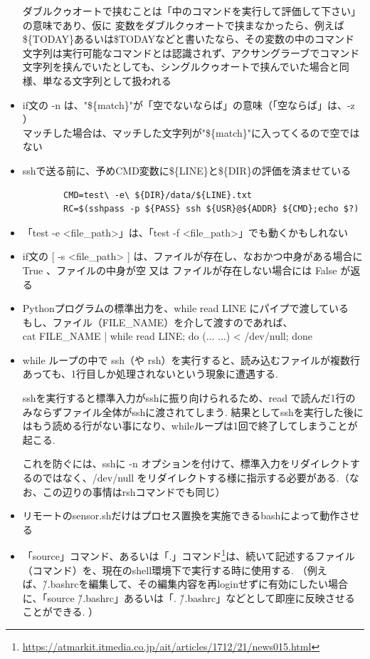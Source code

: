 \documentclass[12pt,a4paper,uplatex]{jsarticle}
\begin{document}
\begin{itemize}
	ダブルクゥオートで挟むことは「中のコマンドを実行して評価して下さい」の意味であり、仮に
	変数をダブルクゥオートで挟まなかったら、例えば\$\{TODAY\}あるいは\$TODAYなどと書いたなら、その変数の中のコマンド文字列は実行可能なコマンドとは認識されず、アクサングラーブでコマンド文字列を挟んでいたとしても、シングルクゥオートで挟んでいた場合と同様、単なる文字列として扱われる
	\item if文の -n は、"\$\{match\}"が「空でないならば」の意味（「空ならば」は、-z ）\\マッチした場合は、マッチした文字列が"\$\{match\}"に入ってくるので空ではない
	\item sshで送る前に、予めCMD変数に\$\{LINE\}と\$\{DIR\}の評価を済ませている
	\begin{verbatim}
		CMD=test\ -e\ ${DIR}/data/${LINE}.txt
		RC=$(sshpass -p ${PASS} ssh ${USR}@${ADDR} ${CMD};echo $?)
	\end{verbatim}
	\item 「test -e <file\_path>」は、「test -f <file\_path>」でも動くかもしれない
	\item if文の [ -s <file\_path> ] は、ファイルが存在し、なおかつ中身がある場合に True 、ファイルの中身が空 又は ファイルが存在しない場合には False が返る 
	\item Pythonプログラムの標準出力を、while read LINE にパイプで渡している\\もし、ファイル（FILE\_NAME）を介して渡すのであれば、\\ cat FILE\_NAME | while read LINE; do (... ...) < /dev/null; done
	\item while ループの中で ssh（や rsh）を実行すると、読み込むファイルが複数行あっても、1行目しか処理されないという現象に遭遇する.
	
	sshを実行すると標準入力がsshに振り向けられるため、read で読んだ1行のみならずファイル全体がsshに渡されてしまう. 結果としてsshを実行した後にはもう読める行がない事になり、whileループは1回で終了してしまうことが起こる.
	
	これを防ぐには、sshに -n オプションを付けて、標準入力をリダイレクトするのではなく、/dev/null をリダイレクトする様に指示する必要がある.（なお、この辺りの事情はrshコマンドでも同じ）
	\item リモートのsensor.shだけはプロセス置換を実施できるbashによって動作させる %
	\item 「source」コマンド、あるいは「.」コマンド\footnote{\url{https://atmarkit.itmedia.co.jp/ait/articles/1712/21/news015.html}}は、続いて記述するファイル（コマンド）を、現在のshell環境下で実行する時に使用する. （例えば、\~/.bashrcを編集して、その編集内容を再loginせずに有効にしたい場合に、「source \~/.bashrc」あるいは「. \~/.bashrc」などとして即座に反映させることができる. ）
	

\end{itemize}
\end{document}
